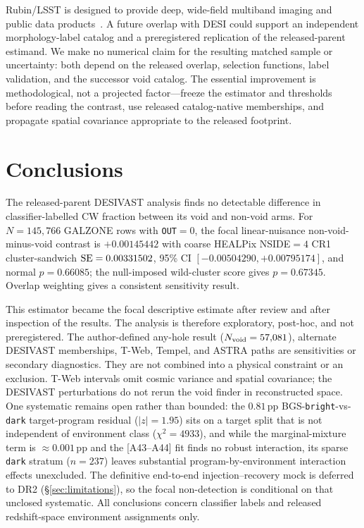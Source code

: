 \documentclass[twocolumn,linenumbers]{aastex702}
\begin{document}
Rubin/LSST is designed to provide deep, wide-field multiband imaging and
public data products~\cite{Ivezic2019}. A future overlap with DESI could
support an independent morphology-label catalog and a preregistered
replication of the released-parent estimand. We make no numerical claim
for the resulting matched sample or uncertainty: both depend on the
released overlap, selection functions, label validation, and the
successor void catalog. The essential improvement is methodological, not
a projected factor---freeze the estimator and thresholds before reading
the contrast, use released catalog-native memberships, and propagate
spatial covariance appropriate to the released footprint.

\section{Conclusions}\label{sec:conclusions}

The released-parent DESIVAST analysis finds no detectable difference in
classifier-labelled CW fraction between its void and non-void arms. For
$N=145{,}766$ GALZONE rows with \texttt{OUT}$=0$, the focal
linear-nuisance non-void-minus-void contrast is $+0.00145442$ with coarse
HEALPix NSIDE$=4$ CR1 cluster-sandwich ${\rm SE}=0.00331502$, 95\% CI
$[-0.00504290,+0.00795174]$, and normal $p=0.66085$; the null-imposed
wild-cluster score gives $p=0.67345$. Overlap weighting gives a
consistent sensitivity result.

This estimator became the focal descriptive estimate after review and after
inspection of the results. The analysis is therefore exploratory,
post-hoc, and not preregistered. The author-defined any-hole result
($N_{\rm void}=57{,}081$), alternate DESIVAST memberships, T-Web,
Tempel, and ASTRA paths are sensitivities or secondary diagnostics.
They are not combined into a physical constraint or an exclusion.
T-Web intervals omit cosmic variance and spatial covariance; the
DESIVAST perturbations do not rerun the void finder in reconstructed
space. One systematic remains open rather than bounded: the
$0.81$\,pp BGS-\texttt{bright}-vs-\texttt{dark} target-program residual
($|z| = 1.95$) sits on a target split that is not independent of
environment class ($\chi^{2} = 4933$), and while the marginal-mixture
term is ${\approx}0.001$\,pp and the [A43--A44] fit finds no robust
interaction, its sparse \texttt{dark} stratum ($n = 237$) leaves
substantial program-by-environment interaction effects unexcluded. The
definitive end-to-end injection--recovery mock is deferred to DR2
(\S\ref{sec:limitations}), so the focal non-detection is conditional on
that unclosed systematic. All conclusions concern classifier labels and
released redshift-space environment assignments only.
\end{document}
